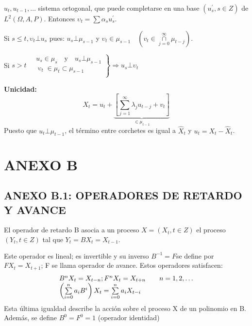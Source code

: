 $u_{t}, u_{t-1},\ldots$ sistema ortogonal, que puede completarse en una base $\left(u_{s}^{'}, s\in Z \right)$ de $L^{2}\left(\Omega, A, P \right)$. Entonces $\upsilon_{t} =\sum\alpha_{s} u_{s}^{'}$.\newline

Si $s\leq t, \upsilon_{t} \bot u_{s}$ pues: $u_{s} \bot \mu_{s-1}$ y $\upsilon_{t} \in \mu_{s-1} \quad \left(v_{t} \in \mathop \cap \limits_{j=0}^{\infty } \mu_{t-j} \right)$.\newline

Si $s>t \quad \left. \begin{array}{l}
u_{s} \in \mu_{s}\quad \text{y}\quad u_{s} \bot \mu_{s-1} \\ 
\mathop \mathop \upsilon_{t} \in \mu_{t} \subset \mu_{s-1} \\ 
\end{array} \right\} \Rightarrow u_{s} \bot \upsilon_{t}$\newline

\textbf{Unicidad:}
\[
X_{t} =u_{t} +\underbrace {\left[\sum_{j=1}^{\infty} \lambda_{j} u_{t-j} +v_{t} \right]}_{\in \mu_{t-1}}
\]
Puesto que $u_{t} \bot \mu_{t-1}$, el t\'{e}rmino entre corchetes es igual a $\hat{X}_{t}$ y $u_{t} =X_{t} -\hat{X}_{t}$.



\chapter*{ANEXO B}
\section{ANEXO B.1: OPERADORES DE RETARDO Y AVANCE}
El operador de retardo B asocia a un proceso $X=\left(X_{t}, t\in Z \right)$ el proceso $\left(Y_{t}, t\in Z \right)$ tal que $Y_{t} =BX_{t} =X_{t-1}$.\newline

Este operador es lineal; es invertible y su inverso $B^{-1}=F$se define por$FX_{t} =X_{t+1} $; F se llama operador de avance. Estos operadores satisfacen:
\[
\begin{array}{l}
 B^{n}X_{t} =X_{t-n};F^{n}X_{t} =X_{t+n} \quad \quad 
n=1,2,\mathellipsis \\ 
 \left( {\sum\limits_{i=0}^n {a_{i} B^{i}} } \right)X_{t} 
=\sum\limits_{i=0}^n {a_{i} X_{t-i} } \\ 
 \end{array}
\]
Esta \'{u}ltima igualdad describe la acci\'{o}n sobre el proceso X de un polinomio en B. Adem\'{a}s, se define $B^{0}=F^{0}=1$ (operador identidad)\newline

